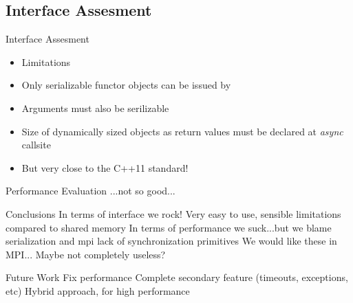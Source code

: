 \documentclass[svgnames]{beamer}
\begin{document}
\subsection{Interface Assesment}
\begin{frame}{Interface Assesment}
\begin{itemize}
	\item Limitations
		\item Only serializable functor objects can be issued by
		\item Arguments must also be serilizable
		\item Size of dynamically sized objects as return values must be declared at \emph{async} callsite 
	\item But very close to the C++11 standard!
\end{itemize}
\end{frame}
\begin{frame}{Performance Evaluation}
...not so good...
\end{frame}
\begin{frame}{Conclusions}
In terms of interface we rock! Very easy to use, sensible limitations compared to shared memory
In terms of performance we suck...but we blame serialization and mpi lack of synchronization primitives
We would like these in MPI...
Maybe not completely useless?
\end{frame}
\begin{frame}{Future Work}
Fix performance
Complete secondary feature (timeouts, exceptions, etc)
Hybrid approach, for high performance
\end{frame}
\end{document}
